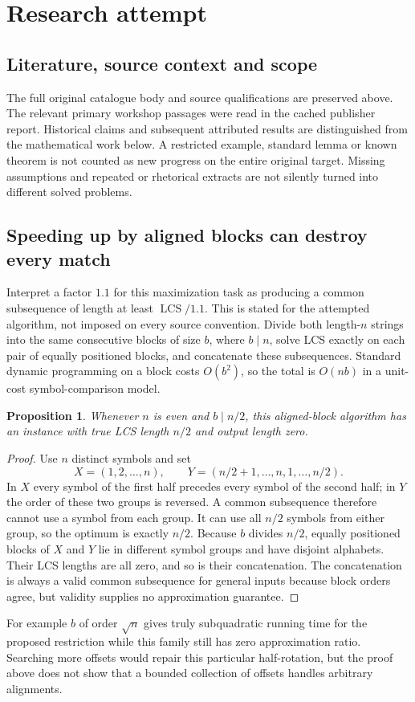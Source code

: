 \documentclass[11pt]{article}
\newtheorem{proposition}{Proposition}
\begin{document}
\section{Research attempt}
\subsection{Literature, source context and scope}
The full original catalogue body and source qualifications are preserved above. The relevant primary workshop passages were read in the cached publisher report. Historical claims and subsequent attributed results are distinguished from the mathematical work below. A restricted example, standard lemma or known theorem is not counted as new progress on the entire original target. Missing assumptions and repeated or rhetorical extracts are not silently turned into different solved problems.

\subsection{Speeding up by aligned blocks can destroy every match}
Interpret a factor $1.1$ for this maximization task as producing a common subsequence of length at least $\operatorname{LCS}/1.1$. This is stated for the attempted algorithm, not imposed on every source convention. Divide both length-$n$ strings into the same consecutive blocks of size $b$, where $b\mid n$, solve LCS exactly on each pair of equally positioned blocks, and concatenate these subsequences. Standard dynamic programming on a block costs $O(b^2)$, so the total is $O(nb)$ in a unit-cost symbol-comparison model.
\begin{proposition}
Whenever $n$ is even and $b\mid n/2$, this aligned-block algorithm has an instance with true LCS length $n/2$ and output length zero.
\end{proposition}
\begin{proof}
Use $n$ distinct symbols and set
\[
X=(1,2,\ldots,n),\qquad
Y=(n/2+1,\ldots,n,1,\ldots,n/2).
\]
In $X$ every symbol of the first half precedes every symbol of the second half; in $Y$ the order of these two groups is reversed. A common subsequence therefore cannot use a symbol from each group. It can use all $n/2$ symbols from either group, so the optimum is exactly $n/2$.
Because $b$ divides $n/2$, equally positioned blocks of $X$ and $Y$ lie in different symbol groups and have disjoint alphabets. Their LCS lengths are all zero, and so is their concatenation. The concatenation is always a valid common subsequence for general inputs because block orders agree, but validity supplies no approximation guarantee.
\end{proof}
For example $b$ of order $\sqrt n$ gives truly subquadratic running time for the proposed restriction while this family still has zero approximation ratio. Searching more offsets would repair this particular half-rotation, but the proof above does not show that a bounded collection of offsets handles arbitrary alignments.
\end{document}
